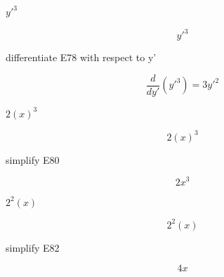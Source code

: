 \documentclass[dvipdfmx]{article}
\begin{document}
$y'^3$

\begin{equation}
  y'^3
  \label{eq:E78}
\end{equation}

differentiate E78 with respect to y'

\begin{equation}
  \frac{d}{dy'}\left(y'^3\right) = 3 y'^2
  \label{eq:E79}
\end{equation}

$2 (x)^3$

\begin{equation}
  2 (x)^3
  \label{eq:E80}
\end{equation}

simplify E80

\begin{equation}
  2 x^3
  \label{eq:E81}
\end{equation}

$2^2 (x)$

\begin{equation}
  2^2 (x)
  \label{eq:E82}
\end{equation}

simplify E82

\begin{equation}
  4 x
  \label{eq:E83}
\end{equation}
\end{document}
